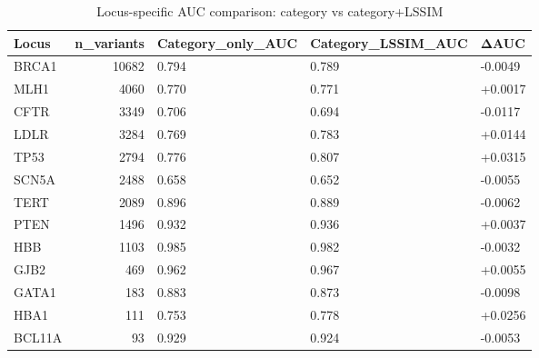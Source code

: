 \begin{table}
\caption{Locus-specific AUC comparison: category vs category+LSSIM}
\label{tab:locus_auc}
\begin{tabular}{lrlll}
\toprule
Locus & n_variants & Category_only_AUC & Category_LSSIM_AUC & ΔAUC \\
\midrule
BRCA1 & 10682 & 0.794 & 0.789 & -0.0049 \\
MLH1 & 4060 & 0.770 & 0.771 & +0.0017 \\
CFTR & 3349 & 0.706 & 0.694 & -0.0117 \\
LDLR & 3284 & 0.769 & 0.783 & +0.0144 \\
TP53 & 2794 & 0.776 & 0.807 & +0.0315 \\
SCN5A & 2488 & 0.658 & 0.652 & -0.0055 \\
TERT & 2089 & 0.896 & 0.889 & -0.0062 \\
PTEN & 1496 & 0.932 & 0.936 & +0.0037 \\
HBB & 1103 & 0.985 & 0.982 & -0.0032 \\
GJB2 & 469 & 0.962 & 0.967 & +0.0055 \\
GATA1 & 183 & 0.883 & 0.873 & -0.0098 \\
HBA1 & 111 & 0.753 & 0.778 & +0.0256 \\
BCL11A & 93 & 0.929 & 0.924 & -0.0053 \\
\bottomrule
\end{tabular}
\end{table}
